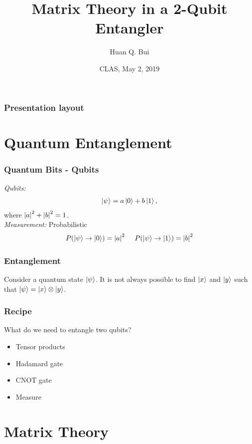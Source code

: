 \documentclass{beamer}
\title{Matrix Theory in a 2-Qubit Entangler}
\author[Huan Q. Bui] %
{Huan Q. Bui}
\institute[Colby College] %
{
	
	Matrix Analysis
	\and
	Professor Leo Livshits
}
\date{CLAS, May 2, 2019}
\theoremstyle{definition}
\begin{document}
 
\frame{\titlepage}
 
\begin{frame}
\frametitle{Presentation layout}
\tableofcontents
\end{frame}

\section{Quantum Entanglement}

\begin{frame}
\frametitle{Quantum Bits - Qubits}

\textit{Qubits:}
\begin{align*}
\left\vert{\psi}\right\rangle = a\left\vert{0}\right\rangle + b\left\vert{1}\right\rangle,
\end{align*}
where $\abs{a}^2 + \abs{b}^2 = 1$. \\
$\,$\\
\textit{Measurement: } Probabilistic
\begin{align*}
P(\left\vert{\psi}\right\rangle \to \left\vert{0}\right\rangle) = \abs{a}^2\hspace{0.5cm}
P(\left\vert{\psi}\right\rangle \to \left\vert{1}\right\rangle) = \abs{b}^2
\end{align*}
\end{frame}


\begin{frame}
\frametitle{Entanglement}
Consider a quantum state $\left\vert{\psi}\right\rangle$. It is not always possible to find $\left\vert{x}\right\rangle$ and $\left\vert{y}\right\rangle$ such that $\left\vert{\psi}\right\rangle = \left\vert{x}\right\rangle \otimes \left\vert{y}\right\rangle$.   


\end{frame}



\begin{frame}
\frametitle{Recipe}

What do we need to entangle two qubits?
\begin{itemize}
	\item Tensor products
	\item Hadamard gate
	\item CNOT gate
	\item Measure
\end{itemize}
\end{frame}








\section{Matrix Theory}
\end{document}
